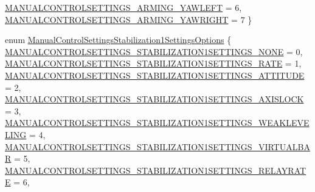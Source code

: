 \begin{DoxyCompactItemize}
\hyperlink{group___manual_control_settings_gga4e7ae9ed58a88df22a070fc64ed87c54a022c01d43899a2b4c62e2114fcbf2716}{\-M\-A\-N\-U\-A\-L\-C\-O\-N\-T\-R\-O\-L\-S\-E\-T\-T\-I\-N\-G\-S\-\_\-\-A\-R\-M\-I\-N\-G\-\_\-\-Y\-A\-W\-L\-E\-F\-T} = 6, 
\hyperlink{group___manual_control_settings_gga4e7ae9ed58a88df22a070fc64ed87c54a419024b79230422bf04e067a9f34677a}{\-M\-A\-N\-U\-A\-L\-C\-O\-N\-T\-R\-O\-L\-S\-E\-T\-T\-I\-N\-G\-S\-\_\-\-A\-R\-M\-I\-N\-G\-\_\-\-Y\-A\-W\-R\-I\-G\-H\-T} = 7
 \}
\item 
enum \hyperlink{group___manual_control_settings_ga9503b3f6b8095b4705774caf4b6f3eb5}{\-Manual\-Control\-Settings\-Stabilization1\-Settings\-Options} \{ \*
\hyperlink{group___manual_control_settings_gga9503b3f6b8095b4705774caf4b6f3eb5ac2ac229305b2c7c0ad66b7c1d0d68401}{\-M\-A\-N\-U\-A\-L\-C\-O\-N\-T\-R\-O\-L\-S\-E\-T\-T\-I\-N\-G\-S\-\_\-\-S\-T\-A\-B\-I\-L\-I\-Z\-A\-T\-I\-O\-N1\-S\-E\-T\-T\-I\-N\-G\-S\-\_\-\-N\-O\-N\-E} = 0, 
\hyperlink{group___manual_control_settings_gga9503b3f6b8095b4705774caf4b6f3eb5acfbfb05a50bdfc3bd22aafbf163d0b32}{\-M\-A\-N\-U\-A\-L\-C\-O\-N\-T\-R\-O\-L\-S\-E\-T\-T\-I\-N\-G\-S\-\_\-\-S\-T\-A\-B\-I\-L\-I\-Z\-A\-T\-I\-O\-N1\-S\-E\-T\-T\-I\-N\-G\-S\-\_\-\-R\-A\-T\-E} = 1, 
\hyperlink{group___manual_control_settings_gga9503b3f6b8095b4705774caf4b6f3eb5a7cfe1b5a8f7305c580fc88bcffb3d055}{\-M\-A\-N\-U\-A\-L\-C\-O\-N\-T\-R\-O\-L\-S\-E\-T\-T\-I\-N\-G\-S\-\_\-\-S\-T\-A\-B\-I\-L\-I\-Z\-A\-T\-I\-O\-N1\-S\-E\-T\-T\-I\-N\-G\-S\-\_\-\-A\-T\-T\-I\-T\-U\-D\-E} = 2, 
\hyperlink{group___manual_control_settings_gga9503b3f6b8095b4705774caf4b6f3eb5ab3379f383713bcfe33e180d23f7b2507}{\-M\-A\-N\-U\-A\-L\-C\-O\-N\-T\-R\-O\-L\-S\-E\-T\-T\-I\-N\-G\-S\-\_\-\-S\-T\-A\-B\-I\-L\-I\-Z\-A\-T\-I\-O\-N1\-S\-E\-T\-T\-I\-N\-G\-S\-\_\-\-A\-X\-I\-S\-L\-O\-C\-K} = 3, 
\*
\hyperlink{group___manual_control_settings_gga9503b3f6b8095b4705774caf4b6f3eb5a44468a61fded6daf0cbf592c9edc9f4d}{\-M\-A\-N\-U\-A\-L\-C\-O\-N\-T\-R\-O\-L\-S\-E\-T\-T\-I\-N\-G\-S\-\_\-\-S\-T\-A\-B\-I\-L\-I\-Z\-A\-T\-I\-O\-N1\-S\-E\-T\-T\-I\-N\-G\-S\-\_\-\-W\-E\-A\-K\-L\-E\-V\-E\-L\-I\-N\-G} = 4, 
\hyperlink{group___manual_control_settings_gga9503b3f6b8095b4705774caf4b6f3eb5a5c649cdbb4d24f703df5cf1d68269010}{\-M\-A\-N\-U\-A\-L\-C\-O\-N\-T\-R\-O\-L\-S\-E\-T\-T\-I\-N\-G\-S\-\_\-\-S\-T\-A\-B\-I\-L\-I\-Z\-A\-T\-I\-O\-N1\-S\-E\-T\-T\-I\-N\-G\-S\-\_\-\-V\-I\-R\-T\-U\-A\-L\-B\-A\-R} = 5, 
\hyperlink{group___manual_control_settings_gga9503b3f6b8095b4705774caf4b6f3eb5aa1c190a20e0fe434d87ebddce1acd55f}{\-M\-A\-N\-U\-A\-L\-C\-O\-N\-T\-R\-O\-L\-S\-E\-T\-T\-I\-N\-G\-S\-\_\-\-S\-T\-A\-B\-I\-L\-I\-Z\-A\-T\-I\-O\-N1\-S\-E\-T\-T\-I\-N\-G\-S\-\_\-\-R\-E\-L\-A\-Y\-R\-A\-T\-E} = 6, 

\end{DoxyCompactItemize}

